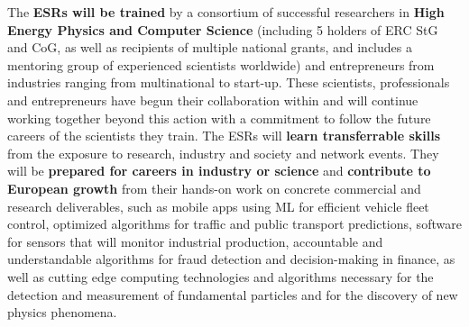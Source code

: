 The \acronym \textbf{ESRs will be trained} by a consortium of successful researchers in \textbf{High Energy Physics and Computer Science} (including 5 holders of ERC StG and CoG, as well as recipients of multiple national grants, and includes a mentoring group of experienced scientists worldwide) and entrepreneurs from industries ranging from multinational to start-up. 
These scientists, professionals and entrepreneurs have begun their collaboration within \acronym and will continue working together beyond this action with a commitment to follow the future careers of the scientists they train. 
The ESRs will \textbf{learn transferrable skills} from the exposure to research, industry and society and network events. 
They will be \textbf{prepared for careers in industry or science} and \textbf{contribute to European growth} from their hands-on work on concrete commercial and research deliverables, such as 
mobile apps using ML for efficient vehicle fleet control, 
optimized algorithms for traffic and public transport predictions,
software for sensors that will monitor industrial production, 
accountable and understandable algorithms for fraud detection and decision-making in finance,
as well as cutting edge computing technologies and algorithms necessary for the detection and measurement of fundamental particles and for the discovery of new physics phenomena. 
